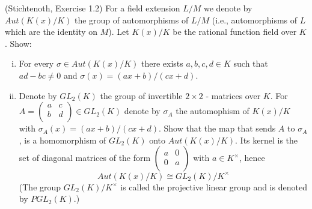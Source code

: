 \begin{exercise}(Stichtenoth, Exercise 1.2) \label{GLP2}
For a field extension $L/M$ we denote by $Aut(K(x)/K)$ the group 
of automorphisms of $L/M$ (i.e., automorphisms of $L$ which are 
the identity on $M$). Let $K(x)/K$ be the rational function field 
over $K$. Show:

\begin{enumerate}[(i)]

\item \label{existsabcd} For every $\sigma \in Aut(K(x)/K)$ there 
exists $a,b,c,d \in K$ such that $ad-bc \neq 0$ and $\sigma (x) = (ax+b)/(cx+d)$. 


\item Denote by $GL_2(K)$ the group of invertible $2 \times 2$ 
- matrices over $K$. For $A= 
\begin{pmatrix} a & c \\ b & d \\ \end{pmatrix} \in GL_2(K)$ 
denote by $\sigma_A$ the automophism of $K(x)/K$ with $\sigma_A(x) = (ax+b)/(cx+d) $. 
Show that the map that sends $A$ to $\sigma_A$, is a homomorphism of $GL_2(K) $ 
onto $Aut(K(x)/K)$. Its kernel is the set of diagonal matrices of the 
form $\begin{pmatrix} a & 0 \\ 0 & a \\ \end{pmatrix}$ with $a \in K^{\times}$, 
hence $$Aut(K(x)/K) \cong GL_2(K)/K^{\times}$$ (The group $GL_2(K)/K^{\times}$ 
is called the projective linear group and is denoted by $PGL_2(K)$.)

\end{enumerate}
\end{exercise}

